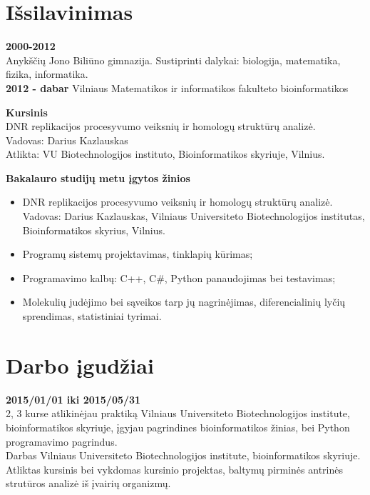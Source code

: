 \documentclass[a4paper,12pt]{article}
\begin{document}
\section{Išsilavinimas}
\textbf{2000-2012} \\
Anykščių Jono Biliūno gimnazija. Sustiprinti dalykai: biologija, matematika, fizika, informatika. \\

\textbf{2012 - dabar}
Vilniaus Matematikos ir informatikos fakulteto bioinformatikos

\textbf{Kursinis} \\
DNR replikacijos procesyvumo veiksnių ir homologų struktūrų analizė. \\
Vadovas: Darius Kazlauskas\\
Atlikta: VU Biotechnologijos instituto, Bioinformatikos skyriuje, Vilnius. 

\textbf{Bakalauro studijų metu įgytos žinios}
\begin{itemize}
	\item DNR replikacijos procesyvumo veiksnių ir homologų struktūrų analizė. Vadovas: Darius Kazlauskas, Vilniaus Universiteto Biotechnologijos institutas, Bioinformatikos skyrius, Vilnius. 
	\item Programų sistemų projektavimas, tinklapių kūrimas;
	\item Programavimo kalbų: C++, C\#, Python panaudojimas bei testavimas;
	\item Molekulių judėjimo bei sąveikos tarp jų nagrinėjimas, diferencialinių lyčių sprendimas, 
statistiniai tyrimai.
\end{itemize}

\clearpage

\vspace{8cm}


\section{Darbo įgudžiai}
\textbf{2015/01/01 iki 2015/05/31} \\
2, 3 kurse atlikinėjau praktiką Vilniaus Universiteto Biotechnologijos institute, bioinformatikos skyriuje, įgyjau pagrindines bioinformatikos žinias, bei Python programavimo pagrindus.   \\
Darbas Vilniaus Universiteto Biotechnologijos institute, bioinformatikos skyriuje. Atliktas kursinis bei vykdomas kursinio projektas, baltymų pirminės antrinės strutūros  analizė iš įvairių organizmų. 

\vspace{2cm}
\end{document}
